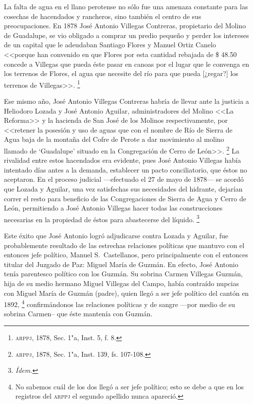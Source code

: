 \documentclass[14pt,twoside,final]{extbook} %
\let\oldfootnote\footnote
\renewcommand\footnote[1]{%
\oldfootnote{\hspace{1mm}#1}}
\begin{document}
La falta de agua en el llano perotense no sólo fue una amenaza constante para las cosechas de hacendados y rancheros, sino también el centro de sus preocupaciones. En 1878 José Antonio Villegas Contreras, propietario del Molino de Guadalupe, se vio obligado a comprar un predio pequeño y perder los intereses de un capital que le adeudaban Santiago Flores y Manuel Ortiz Canelo <<porque han convenido en que Flores por esta cantidad rebajada de \$ 48.50 concede a Villegas que pueda éste pasar en canoas por el lugar que le convenga en los terrenos de Flores, el agua que necesite del río para que pueda [¿regar?] los terrenos de Villegas>>.\footnote{\textsc{arppj}, 1878, Sec. 1"a, Inst. 5, f. 8.}

Ese mismo año, José Antonio Villegas Contreras habría de llevar ante la justicia a Heliodoro Lozada y José Antonio Aguilar, administradores del Molino <<La Reforma>> y la hacienda de San José de los Molinos respectivamente, por <<retener la posesión y uso de aguas que con el nombre de Río de Sierra de Agua baja de la montaña del Cofre de Perote a dar movimiento al molino llamado de  `Guadalupe' situado en la Congregación de Cerro de León>>.\footnote{\textsc{arppj}, 1878, Sec. 1"a, Inst. 139, fs. 107-108.} La rivalidad entre estos hacendados era evidente, pues José Antonio Villegas había intentado días antes a la demanda, establecer un pacto conciliatorio, que éstos no aceptaron. En el proceso judicial ---efectuado el 27 de mayo de 1878--- se acordó que Lozada y Aguilar, una vez satisfechas sus necesidades del hidrante, dejarían correr el resto para beneficio de las Congregaciones de Sierra de Agua y Cerro de León, permitiendo a José Antonio Villegas hacer todas las construcciones necesarias en la propiedad de éstos para abastecerse del líquido.\footnote{\em Ídem.}

Este éxito que José Antonio logró adjudicarse contra Lozada y Aguilar, fue probablemente resultado de las estrechas relaciones políticas que mantuvo con el entonces jefe político, Manuel S.~Castellanos, pero principalmente con el entonces titular del Juzgado de Paz: Miguel María de Guzmán. En efecto, José Antonio tenía parentesco político con los Guzmán. Su sobrina Carmen Villegas Guzmán, hija de su
medio hermano Miguel Villegas del Campo, había contraído nupcias con Miguel María de Guzmán (padre), quien llegó a ser jefe político del cantón en 1892,\footnote{No sabemos cuál de los dos llegó a ser jefe político; esto se debe a que en los registros del \textsc{arppj} el segundo apellido nunca apareció.} confirmándonos las relaciones políticas y de sangre ---por medio de su sobrina Carmen-- que éste mantenía con Guzmán.
\end{document}

